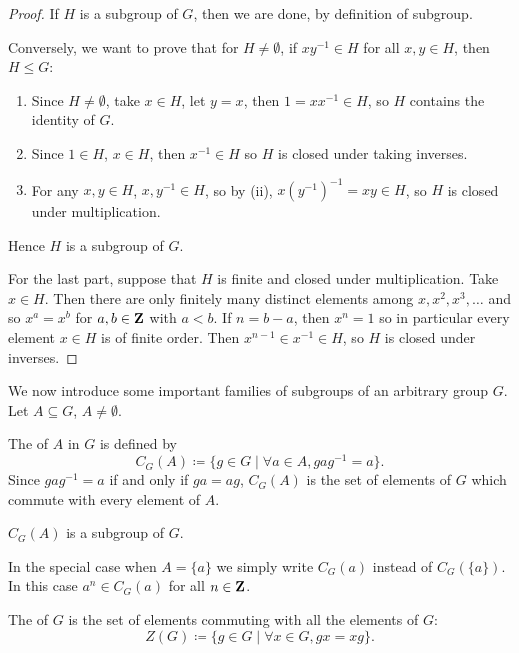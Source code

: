\begin{proof}
If $H$ is a subgroup of $G$, then we are done, by definition of subgroup.

Conversely, we want to prove that for $H\neq\emptyset$, if $xy^{-1}\in H$ for all $x,y\in H$, then $H\le G$:
\begin{enumerate}[label=(\roman*)]
\item Since $H\neq\emptyset$, take $x\in H$, let $y=x$, then $1=xx^{-1}\in H$, so $H$ contains the identity of $G$.
\item Since $1\in H$, $x\in H$, then $x^{-1}\in H$ so $H$ is closed under taking inverses.
\item For any $x,y\in H$, $x,y^{-1}\in H$, so by (ii), $x(y^{-1})^{-1}=xy\in H$, so $H$ is closed under multiplication.
\end{enumerate}
Hence $H$ is a subgroup of $G$.

For the last part, suppose that $H$ is finite and closed under multiplication. Take $x\in H$. Then there are only finitely many distinct elements among $x,x^2,x^3,\dots$ and so $x^a=x^b$ for $a,b\in\mathbf Z$ with $a<b$. If $n=b-a$, then $x^n=1$ so in particular every element $x\in H$ is of finite order. Then $x^{n-1}\in x^{-1}\in H$, so $H$ is closed under inverses.
\end{proof}

We now introduce some important families of subgroups of an arbitrary group $G$. Let $A\subseteq G$, $A\neq\emptyset$.

\begin{definition}[Centraliser]
The  of $A$ in $G$ is defined by
\[C_G(A)\coloneqq\{g\in G\mid\forall a\in A,gag^{-1}=a\}.\]
Since $gag^{-1}=a$ if and only if $ga=ag$, $C_G(A)$ is the set of elements of $G$ which commute with every element of $A$.
\end{definition}

\begin{proposition}
$C_G(A)$ is a subgroup of $G$.
\end{proposition}

\begin{notation}
In the special case when $A=\{a\}$ we simply write $C_G(a)$ instead of $C_G(\{a\})$. In this case $a^n\in C_G(a)$ for all $n\in\mathbf Z$.
\end{notation}

\begin{definition}[Center]
The  of $G$ is the set of elements commuting with all the elements of $G$:
\[Z(G)\coloneqq\{g\in G\mid\forall x\in G,gx=xg\}.\]
\end{definition}

